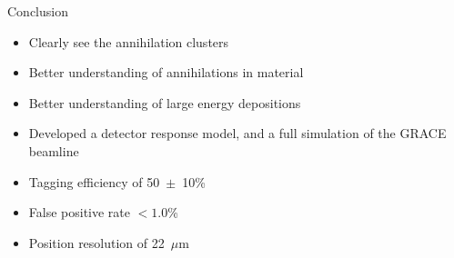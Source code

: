 \documentclass{beamer}
\begin{document}
\begin{frame}{Conclusion}
  \begin{itemize}
  \item{Clearly see the annihilation clusters}
  \item{Better understanding of annihilations in material}
  \item{Better understanding of large energy depositions} 
  \item{Developed a detector response model, and a full simulation of the GRACE beamline}
  \item{Tagging efficiency of 50~$\pm$~10\%}
  \item{False positive rate $< 1.0$\%}
  \item{Position resolution of 22~$\mu$m}
  \end{itemize}
\end{frame}
  


\end{document}

